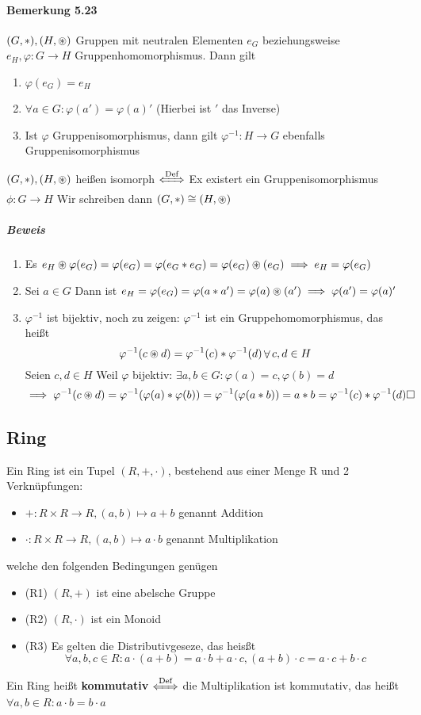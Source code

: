 \documentclass[a4paper]{scrartcl}
\DeclareMathOperator{\Forall}{\forall}
\theoremstyle{definition}
\theoremstyle{plain}
\theoremstyle{plain}
\theoremstyle{remark}
\theoremstyle{remark}
\theoremstyle{remark}
\theoremstyle{remark}
\theoremstyle{remark}
\begin{document}
\paragraph{Bemerkung 5.23}
\label{sec-3-1-8-2}
$(G,*),(H,\oast)$ Gruppen mit neutralen Elementen $e_G$ beziehungsweise $e_H,\varphi:G\to H$ Gruppenhomomorphismus. Dann gilt
\begin{enumerate}
\item $\varphi(e_G) = e_H$
\item $\Forall a\in G:\varphi(a') = \varphi(a)'$ (Hierbei ist $'$ das Inverse)
\item Ist $\varphi$ Gruppenisomorphismus, dann gilt $\varphi^{-1}:H\to G$ ebenfalls Gruppenisomorphismus
\end{enumerate}
$(G,*),(H,\oast)$ heißen isomorph $\xLeftrightarrow{\text{Def}}$ Ex existert ein Gruppenisomorphismus $\phi:G\to H$ Wir schreiben dann $(G,*) \cong (H,\oast)$
\subparagraph{Beweis}
\label{sec-3-1-8-2-1}
\begin{enumerate}
\item Es $e_H\oast \varphi(e_G) = \varphi(e_G) = \varphi(e_G*e_G) = \varphi(e_G) \oast(e_G) \implies e_H = \varphi(e_G)$
\item Sei $a\in G$ Dann ist $e_H = \varphi(e_G) = \varphi(a*a') = \varphi(a)\oast(a') \implies \varphi(a') = \varphi(a)'$
\item $\varphi^{-1}$ ist bijektiv, noch zu zeigen: $\varphi^{-1}$ ist ein Gruppehomomorphismus, das heißt
\[\varphi^{-1}(c\oast d) = \varphi^{-1}(c)*\varphi^{-1}(d) \Forall c,d\in H\]
Seien $c,d\in H$ Weil $\varphi$ bijektiv: $\exists a,b\in G:\varphi(a) = c,\varphi(b) =d$
\[\implies \varphi^{-1}(c\oast d) = \varphi^{-1}(\varphi(a)*\varphi(b)) = \varphi^{-1}(\varphi(a*b)) = a*b = \varphi^{-1}(c)*\varphi^{-1}(d)\hfill\square\]
\end{enumerate}
\subsection{Ring}
\label{sec-3-2}
Ein Ring ist ein Tupel $(R,+,\cdot)$, bestehend aus einer Menge R und 2 Verknüpfungen:
\begin{itemize}
\item $+:R\times R \to R,(a,b)\mapsto a + b$ \hfill genannt Addition
\item $\cdot:R\times R\to R, (a,b)\mapsto a\cdot b$ \hfill genannt Multiplikation
\end{itemize}
welche den folgenden Bedingungen genügen
\begin{itemize}
\item (R1) $(R,+)$ ist eine abelsche Gruppe
\item (R2) $(R,\cdot)$ ist ein Monoid
\item (R3) Es gelten die Distributivgeseze, das heisßt
\[\Forall a,b,c\in R: a\cdot(a + b) = a\cdot b + a\cdot c, (a+b)\cdot c = a\cdot c + b\cdot c\]
\end{itemize}
Ein Ring heißt \textbf{kommutativ} $\xLeftrightarrow{\text{Def}}$ die Multiplikation ist kommutativ, das heißt $\Forall a,b\in R: a\cdot b = b\cdot a$
\end{document}
